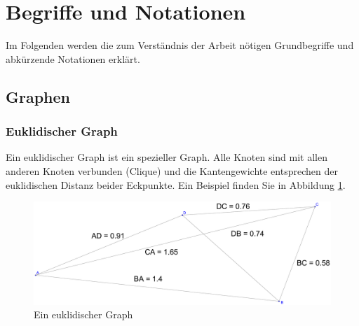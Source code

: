 \documentclass[a4paper,twoside]{IEEEtran}
\begin{document}
\section{Begriffe und Notationen}
Im Folgenden werden die zum Verständnis der Arbeit nötigen Grundbegriffe und abkürzende Notationen erklärt.




\subsection{Graphen}
\subsubsection{Euklidischer Graph}
Ein euklidischer Graph ist ein spezieller Graph. 
Alle Knoten sind mit allen anderen Knoten verbunden (Clique) und die Kantengewichte entsprechen der euklidischen Distanz beider Eckpunkte. 
Ein Beispiel finden Sie in Abbildung \ref{fig:Graph}.
\begin{figure}[h!]
\centering
\includegraphics[width=0.99\linewidth]{Graph.eps}
\caption{Ein euklidischer Graph}
\label{fig:Graph}
\end{figure}
\end{document}
